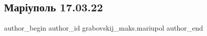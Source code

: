  
 
 
 
 

\subsection{Маріуполь 17.03.22}
\label{sec:17_03_2023.fb.grabovskij_maks.mariupol.1.mar_upol_17_03_22}

\ifcmt
 author_begin
   author_id grabovskij_maks.mariupol
 author_end
\fi

